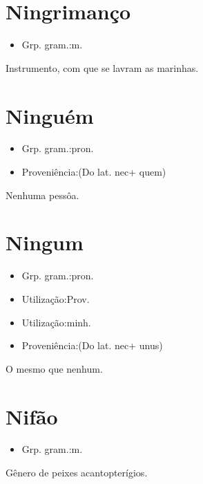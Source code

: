 \section{Ningrimanço}
\begin{itemize}
\item {Grp. gram.:m.}
\end{itemize}
Instrumento, com que se lavram as marinhas.
\section{Ninguém}
\begin{itemize}
\item {Grp. gram.:pron.}
\end{itemize}
\begin{itemize}
\item {Proveniência:(Do lat. \textunderscore nec\textunderscore  + \textunderscore quem\textunderscore )}
\end{itemize}
Nenhuma pessôa.
\section{Ningum}
\begin{itemize}
\item {Grp. gram.:pron.}
\end{itemize}
\begin{itemize}
\item {Utilização:Prov.}
\end{itemize}
\begin{itemize}
\item {Utilização:minh.}
\end{itemize}
\begin{itemize}
\item {Proveniência:(Do lat. \textunderscore nec\textunderscore  + \textunderscore unus\textunderscore )}
\end{itemize}
O mesmo que \textunderscore nenhum\textunderscore .
\section{Nifão}
\begin{itemize}
\item {Grp. gram.:m.}
\end{itemize}
Gênero de peixes acantopterígios.
